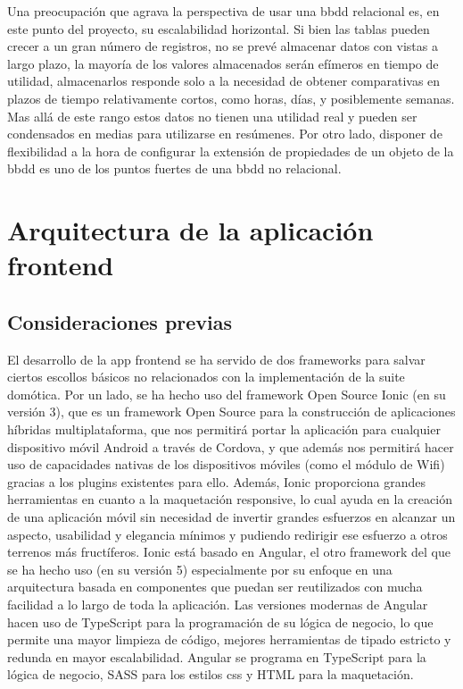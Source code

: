 Una preocupación que agrava la perspectiva de usar una \gls{bbdd} relacional es, en este punto del proyecto, su escalabilidad horizontal. Si bien las tablas pueden crecer a un gran número de registros, no se prevé almacenar datos con vistas a largo plazo, la mayoría de los valores almacenados serán efímeros en tiempo de utilidad, almacenarlos responde solo a la necesidad de obtener comparativas en plazos de tiempo relativamente cortos, como horas, días, y posiblemente semanas. Mas allá de este rango estos datos no tienen una utilidad real y pueden ser condensados en medias para utilizarse en resúmenes. Por otro lado, disponer de flexibilidad a la hora de configurar la extensión de propiedades de un objeto de la \gls{bbdd} es uno de los puntos fuertes de una \gls{bbdd} no relacional.


\section{Arquitectura de la aplicación frontend}
\label{makereference4.6}

\subsection{Consideraciones previas}
\label{makereference4.6.1}

El desarrollo de la app frontend se ha servido de dos frameworks para salvar ciertos escollos básicos no relacionados con la implementación de la suite domótica. Por un lado, se ha hecho uso del framework Open Source Ionic (en su versión 3), que es un framework Open Source para la construcción de aplicaciones híbridas multiplataforma, que nos permitirá portar la aplicación para cualquier dispositivo móvil Android a través de Cordova, y que además nos permitirá hacer uso de capacidades nativas de los dispositivos móviles (como el módulo de Wifi) gracias a los plugins existentes para ello. Además, Ionic proporciona grandes herramientas en cuanto a la maquetación responsive, lo cual ayuda en la creación de una aplicación móvil sin necesidad de invertir grandes esfuerzos en alcanzar un aspecto, usabilidad y elegancia mínimos y pudiendo redirigir ese esfuerzo a otros terrenos más fructíferos. Ionic está basado en Angular, el otro framework del que se ha hecho uso (en su versión 5) especialmente por su enfoque en una arquitectura basada en componentes que puedan ser reutilizados con mucha facilidad a lo largo de toda la aplicación. Las versiones modernas de Angular hacen uso de TypeScript para la programación de su lógica de negocio, lo que permite una mayor limpieza de código, mejores herramientas de tipado estricto y redunda en mayor escalabilidad. Angular se programa en TypeScript para la lógica de negocio, SASS para los estilos css y HTML para la maquetación.

